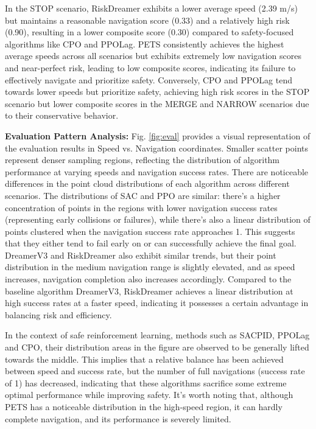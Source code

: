 In the STOP scenario, RiskDreamer exhibits a lower average speed (2.39 \si{m/s}) but maintains a reasonable navigation score (0.33) and a relatively high risk (0.90), resulting in a lower composite score (0.30) compared to safety-focused algorithms like CPO and PPOLag. PETS consistently achieves the highest average speeds across all scenarios but exhibits extremely low navigation scores and near-perfect risk, leading to low composite scores, indicating its failure to effectively navigate and prioritize safety. Conversely, CPO and PPOLag tend towards lower speeds but prioritize safety, achieving high risk scores in the STOP scenario but lower composite scores in the MERGE and NARROW scenarios due to their conservative behavior.

\textbf{Evaluation Pattern Analysis:}
Fig. \ref{fig:eval} provides a visual representation of the evaluation results in Speed vs. Navigation coordinates. Smaller scatter points represent denser sampling regions, reflecting the distribution of algorithm performance at varying speeds and navigation success rates. There are noticeable differences in the point cloud distributions of each algorithm across different scenarios. The distributions of SAC and PPO are similar: there's a higher concentration of points in the regions with lower navigation success rates (representing early collisions or failures), while there's also a linear distribution of points clustered when the navigation success rate approaches 1. This suggests that they either tend to fail early on or can successfully achieve the final goal. DreamerV3 and RiskDreamer also exhibit similar trends, but their point distribution in the medium navigation range is slightly elevated, and as speed increases, navigation completion also increases accordingly. Compared to the baseline algorithm DreamerV3, RiskDreamer achieves a linear distribution at high success rates at a faster speed, indicating it possesses a certain advantage in balancing risk and efficiency.

In the context of safe reinforcement learning, methods such as SACPID, PPOLag and CPO, their distribution areas in the figure are observed to be generally lifted towards the middle. This implies that a relative balance has been achieved between speed and success rate, but the number of full navigations (success rate of 1) has decreased, indicating that these algorithms sacrifice some extreme optimal performance while improving safety. It's worth noting that, although PETS has a noticeable distribution in the high-speed region, it can hardly complete navigation, and its performance is severely limited.

